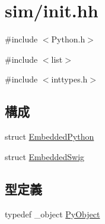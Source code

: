 \hypertarget{init_8hh}{
\section{sim/init.hh}
\label{init_8hh}
}
{\ttfamily \#include $<$Python.h$>$}\par
{\ttfamily \#include $<$list$>$}\par
{\ttfamily \#include $<$inttypes.h$>$}\par
\subsection*{構成}
\begin{DoxyCompactItemize}
\item 
struct \hyperlink{structEmbeddedPython}{EmbeddedPython}
\item 
struct \hyperlink{structEmbeddedSwig}{EmbeddedSwig}
\end{DoxyCompactItemize}
\subsection*{型定義}
\begin{DoxyCompactItemize}
\item 
typedef \_\-object \hyperlink{init_8hh_ae19630c1f4ca6d5236b30719d9140013}{PyObject}
\end{DoxyCompactItemize}
